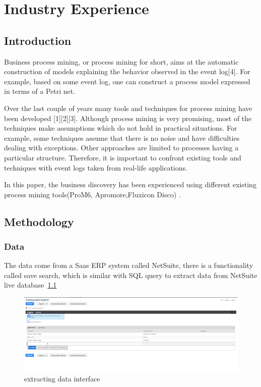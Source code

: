 \chapter{Industry Experience}
\label{chap:industryExperience}

\section{Introduction}
\label{sec:industryExperience-Introduction}

Business process mining, or process mining for short, aims at the automatic construction of models explaining the behavior observed in the event log[4]. For example, based on some event log, one can construct a process model expressed in terms of a Petri net. 

Over the last couple of years many tools and techniques for process mining have been developed [1][2][3]. Although process mining is very promising, most of the techniques make assumptions which do not hold in practical situations. For example, some techniques assume that there is no noise and have difficulties dealing with exceptions. Other approaches are limited to processes having a particular structure. Therefore, it is important to confront existing tools and techniques with event logs taken from real-life applications.

In this paper, the business discovery has been experienced using different existing process mining tools(ProM6, Apromore,Fluxicon Disco) .

\section{Methodology}
\label{sec:industryExperience-Methodology}

\subsection{Data}
The data come from a Saas ERP system called NetSuite, there is a functionality called save search, which is similar with SQL query to extract data from NetSuite live database~\ref{figure:saveSearch}

\begin{figure}[!htb]
    \centering 
    \includegraphics[scale=0.7]{resource/data.png}
    \caption{extracting data interface}
    \label{figure:saveSearch}
\end{figure}

